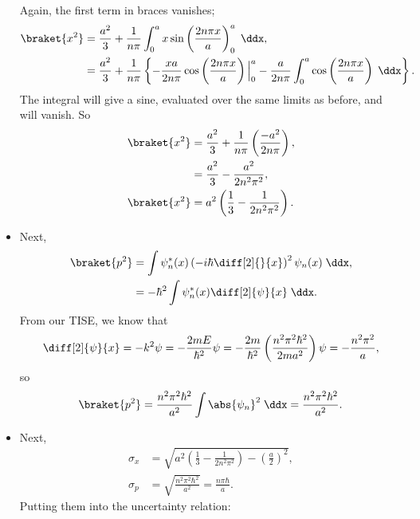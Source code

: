 \begin{example}
\begin{itemize}
            Again, the first term in braces vanishes;
            \begin{align*}
                \braket{x^2} &= \frac{a^2}{3} + \frac{1}{n\pi}\int_0^a x\sin\left(\frac{2n\pi x}{a}\right)_0^a \;\ddx, \\
                &= \frac{a^2}{3} + \frac{1}{n\pi}\left\{-\frac{xa}{2n\pi}\cos\left(\frac{2n\pi x}{a}\right)\Big|_0^a - \frac{a}{2n\pi}\int_0^a \cos\left(\frac{2n\pi x}{a}\right)\;\ddx\right\}.
            \end{align*}
            The integral will give a sine, evaluated over the same limits as before, and will vanish. So
            \begin{align*}
                \braket{x^2} &= \frac{a^2}{3} + \frac{1}{n\pi} \left(\frac{-a^2}{2n\pi}\right), \\
                &= \frac{a^2}{3} - \frac{a^2}{2n^2\pi^2}, \\
                \braket{x^2} &= a^2 \left(\frac{1}{3} - \frac{1}{2n^2\pi^2}\right).
            \end{align*}
        \item Next,
            \begin{align*}
                \braket{p^2} &= \int \psi_n^*(x) \left(-i\hbar \diff[2]{}{x}\right)^2 \psi_n(x) \;\ddx, \\
                &= -\hbar^2 \int \psi_n^*(x) \diff[2]{\psi}{x} \;\ddx.
            \end{align*}
            From our TISE, we know that
            \begin{equation*}
                \diff[2]{\psi}{x} = -k^2\psi = -\frac{2mE}{\hbar^2}\psi = -\frac{2m}{\hbar^2} \left(\frac{n^2\pi^2\hbar^2}{2ma^2}\right)\psi = -\frac{n^2\pi^2}{a},
            \end{equation*}
            so
            \begin{equation*}
                \braket{p^2} = \frac{n^2\pi^2\hbar^2}{a^2}\int \abs{\psi_n}^2 \;\ddx = \frac{n^2\pi^2\hbar^2}{a^2}.
            \end{equation*}
        \item Next,
            \begin{align*}
                \sigma_x &= \sqrt{a^2\left(\frac{1}{3} - \frac{1}{2n^2\pi^2}\right) - \left(\frac{a}{2}\right)^2}, \\
                \sigma_p &= \sqrt{\frac{n^2\pi^2\hbar^2}{a^2}} = \frac{n\pi\hbar}{a}.
            \end{align*}
            Putting them into the uncertainty relation:

\end{itemize}
\end{example}

